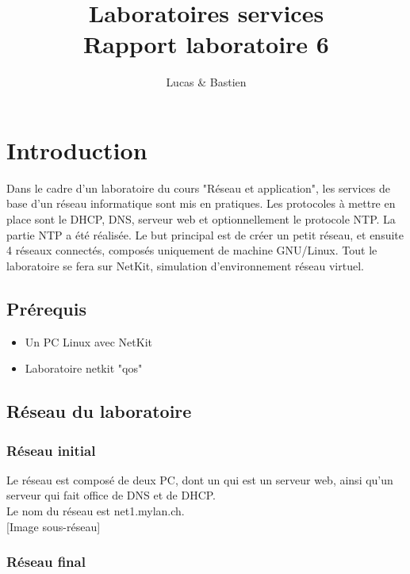 \documentclass{article}
\title{%
	Laboratoires services \\
	\large Rapport laboratoire 6
}
\author{\bsc{Bulloni} Lucas \& \bsc{Wermeille} Bastien}
\begin{document}
\maketitle

\newpage

\tableofcontents

\newpage

\section{Introduction}
	
Dans le cadre d'un laboratoire du cours "Réseau et application", les services de base d'un réseau informatique sont mis en pratiques. Les protocoles à mettre en place sont le DHCP, DNS, serveur web et optionnellement le protocole NTP. La partie NTP a été réalisée. Le but principal est de créer un petit réseau, et ensuite 4 réseaux connectés, composés uniquement de machine GNU/Linux. Tout le laboratoire se fera sur NetKit, simulation d'environnement réseau virtuel.

\subsection{Prérequis}

\begin{itemize}
	\item Un PC Linux avec NetKit
	\item Laboratoire netkit "qos"
\end{itemize}

\subsection{Réseau du laboratoire}

\subsubsection{Réseau initial}

Le réseau est composé de deux PC, dont un qui est un serveur web, ainsi qu'un serveur qui fait office de DNS et de DHCP.\\

Le nom du réseau est net1.mylan.ch.\\

[Image sous-réseau]

\subsubsection{Réseau final}
\end{document}
